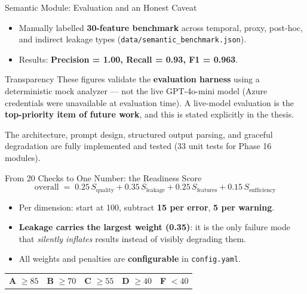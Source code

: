\documentclass[11pt,aspectratio=169]{beamer}
\begin{document}
\begin{frame}{Semantic Module: Evaluation and an Honest Caveat}
  \begin{itemize}\setlength\itemsep{0.6em}
    \item Manually labelled \textbf{30-feature benchmark} across temporal, proxy, post-hoc, and indirect leakage types (\texttt{data/semantic\_benchmark.json}).
    \item Results: \textbf{Precision = 1.00, Recall = 0.93, F1 = 0.963}.
  \end{itemize}
  \vspace{0.5em}
  \begin{alertblock}{Transparency}
    These figures validate the \textbf{evaluation harness} using a deterministic mock
    analyzer --- not the live GPT-4o-mini model (Azure credentials were unavailable at
    evaluation time). A live-model evaluation is the \textbf{top-priority item of future work},
    and this is stated explicitly in the thesis.
  \end{alertblock}
  \vspace{0.5em}
  \footnotesize The architecture, prompt design, structured output parsing, and graceful
  degradation are fully implemented and tested (33 unit tests for Phase 16 modules).
\end{frame}

\begin{frame}{From 20 Checks to One Number: the Readiness Score}
  \begin{equation*}
    \text{overall} \;=\; 0.25\,S_{\text{quality}} + \mathbf{0.35}\,S_{\text{leakage}} + 0.25\,S_{\text{features}} + 0.15\,S_{\text{sufficiency}}
  \end{equation*}
  \vspace{-0.6em}
  \begin{itemize}\setlength\itemsep{0.5em}
    \item Per dimension: start at 100, subtract \textbf{15 per error}, \textbf{5 per warning}.
    \item \textbf{Leakage carries the largest weight (0.35)}: it is the only failure mode that \emph{silently inflates} results instead of visibly degrading them.
    \item All weights and penalties are \textbf{configurable} in \texttt{config.yaml}.
  \end{itemize}
  \vspace{0.4em}
  \begin{center}
    \begin{tabular}{ccccc}
      \colorbox{codegreen!20}{\textbf{A} $\ge 85$} &
      \colorbox{teal!15}{\textbf{B} $\ge 70$} &
      \colorbox{orange!20}{\textbf{C} $\ge 55$} &
      \colorbox{orange!40}{\textbf{D} $\ge 40$} &
      \colorbox{red!20}{\textbf{F} $< 40$}
    \end{tabular}
  \end{center}
\end{frame}
\end{document}
